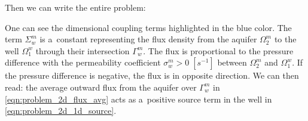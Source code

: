 Then we can write the entire problem:

One can see the dimensional coupling terms highlighted in the blue color.
The term $\Sigma^m_w$ is a~constant representing the flux density from the aquifer $\Omega^m_2$ to the well $\Omega^w_1$
through their intersection $\Gamma^m_w$. 
The flux is proportional to the pressure difference with the permeability coefficient $\sigma^m_w>0\;[s^{-1}]$ between $\Omega^m_2$ and $\Omega^w_1$.
If the pressure difference is negative, the flux is in opposite direction.
We can then read: the average outward flux from the aquifer
over $\Gamma^m_w$ in \eqref{eqn:problem_2d_flux_avg} acts as a~positive source term in the well in \eqref{eqn:problem_2d_1d_source}.

